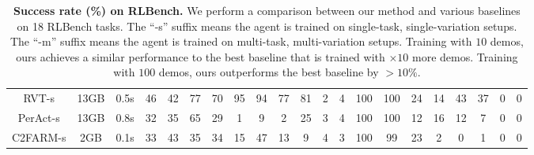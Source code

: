 \begin{table*}[!ht]
\begin{tabular}{ccccccccccccccccccccc}
RVT-s  & 13GB & 0.5s & 46         & 42           & 77           & 70          & 95           & 94            & 77           & 81            & 2           & 4           & 100          & 100          & 24           & 14          & 43          & 37          & 0            & 0           \\
PerAct-s  & 13GB & 0.8s &32         & 35           & 65           & 29          & 1            & 9             & 2            & 25            & 3           & 4           & 100          & 100          & 12           & 16          & 12          & 7           & 0            & 0           \\
C2FARM-s  & 2GB & 0.1s &33       & 43           & 35           & 34          & 15           & 47            & 13           & 9             & 4           &  3          & 100          &  99          & 23           & 2           & 0           & 1           &  0           & 0           \\ 
\bottomrule
\end{tabular}
\caption{\textbf{Success rate (\%) on RLBench.} We perform a comparison between our method and various baselines on 18 RLBench tasks. The ``-s'' suffix means the agent is trained on single-task, single-variation setups. The ``-m'' suffix means the agent is trained on multi-task, multi-variation setups. Training with $10$ demos, ours achieves a similar performance to the best baseline that is trained with $\times 10$ more demos. Training with $100$ demos, ours outperforms the best baseline by $>10\%$.}
\label{table:full_rlbench18}
\vspace{-0.5cm}
\end{table*}